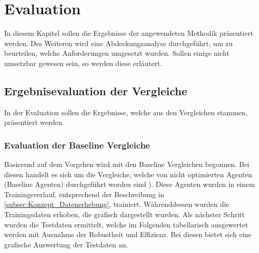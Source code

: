\chapter{Evaluation} \label{chap:Evaluation}
In diesem Kapitel sollen die Ergebnisse der angewendeten Methodik präsentiert werden. Des Weiteren wird eine Abdeckungsanalyse durchgeführt, um zu beurteilen, welche Anforderungen umgesetzt wurden. Sollen einige nicht umsetzbar gewesen sein, so werden diese erläutert.

\section{Ergebnisevaluation der Vergleiche} \label{sec:Evaluation_Ergebnisevaluation}
In der Evaluation sollen die Ergebnisse, welche aus den Vergleichen stammen, präsentiert werden.

\subsection{Evaluation der Baseline Vergleiche}
Basierend auf dem Vorgehen  wird mit den Baseline Vergleichen begonnen. Bei diesen handelt es sich um die Vergleiche, welche von  nicht optimierten Agenten (Baseline Agenten) durchgeführt worden sind ). Diese Agenten wurden in einem Trainingsverlauf, entsprechend der Beschreibung in \autoref{subsec:Konzept_Datenerhebung}, trainiert. 
Währenddessen wurden die Trainingsdaten erhoben, die grafisch dargestellt wurden. 
Als nächster Schritt wurden die Testdaten ermittelt, welche im Folgenden tabellarisch ausgewertet werden mit Ausnahme der Robustheit und Effizienz. Bei diesen bietet sich eine grafische Auswertung der Testdaten an.

